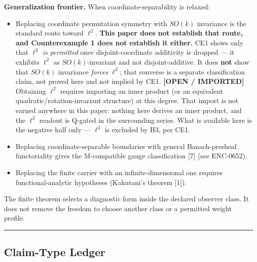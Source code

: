 \documentclass[
  11pt,
]{article}
\providecommand{\tightlist}{%
  \setlength{\itemsep}{0pt}\setlength{\parskip}{0pt}}
\providecommand{\tightlist}{%
  \setlength{\itemsep}{0pt}\setlength{\parskip}{0pt}}
\begin{document}
\textbf{Generalization frontier.} When coordinate-separability is
relaxed:

\begin{itemize}
\tightlist
\item
  Replacing coordinate permutation symmetry with \(SO(k)\) invariance is
  the standard route toward \(\ell^2\). \textbf{This paper does not
  establish that route, and Counterexample 1 does not establish it
  either.} CE1 shows only that \(\ell^2\) \emph{is permitted} once
  disjoint-coordinate additivity is dropped --- it exhibits \(\ell^2\)
  as \(SO(k)\)-invariant and not disjoint-additive. It does \textbf{not}
  show that \(SO(k)\) invariance \emph{forces} \(\ell^2\); that converse
  is a separate classification claim, not proved here and not implied by
  CE1. \textbf{{[}OPEN / IMPORTED{]}} Obtaining \(\ell^2\) requires
  importing an inner product (or an equivalent
  quadratic/rotation-invariant structure) at this degree. That import is
  not earned anywhere in this paper: nothing here derives an inner
  product, and the \(\ell^2\) readout is Q-gated in the surrounding
  series. What is available here is the negative half only ---
  \(\ell^2\) is excluded by H3, per CE1.
\item
  Replacing coordinate-separable boundaries with general Banach-presheaf
  functoriality gives the M-compatible gauge classification {[}7{]} (see
  ENC-0652).
\item
  Replacing the finite carrier with an infinite-dimensional one requires
  functional-analytic hypotheses (Kakutani's theorem {[}1{]}).
\end{itemize}

The finite theorem selects a diagnostic form inside the declared
observer class. It does not remove the freedom to choose another class
or a permitted weight profile.

\begin{center}\rule{0.5\linewidth}{0.5pt}\end{center}

\hypertarget{claim-type-ledger}{%
\subsection{Claim-Type Ledger}\label{claim-type-ledger}}
\end{document}
